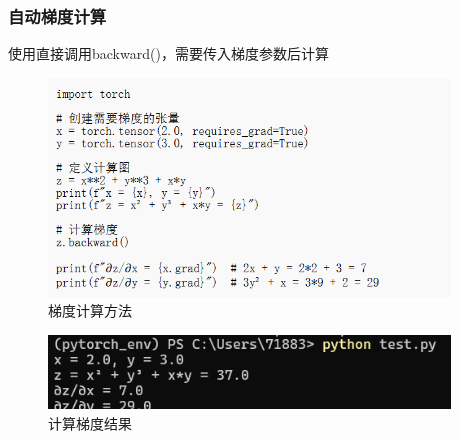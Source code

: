 \documentclass[UTF8]{ctexart}
\begin{document}
\subsubsection{自动梯度计算}
使用直接调用backward()，需要传入梯度参数后计算
\begin{figure}[H]
    \centering
    \includegraphics[width=0.95\textwidth]{picture/梯度计算代码.png}%
    \caption{梯度计算方法}
\end{figure}

\begin{figure}[H]
    \centering
    \includegraphics[width=0.95\textwidth]{picture/梯度计算结果.png}%
    \caption{计算梯度结果}
\end{figure}
\end{document}
